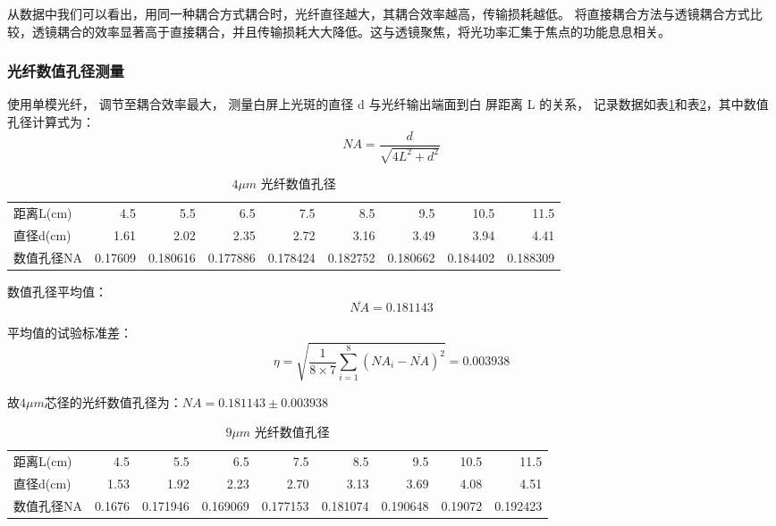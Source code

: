 \documentclass[10pt,a4paper,twoside,UTF8]{ctexart}
\begin{document}
从数据中我们可以看出，用同一种耦合方式耦合时，光纤直径越大，其耦合效率越高，传输损耗越低。
将直接耦合方法与透镜耦合方式比较，透镜耦合的效率显著高于直接耦合，并且传输损耗大大降低。这与透镜聚焦，将光功率汇集于焦点的功能息息相关。

\subsubsection{光纤数值孔径测量}

使用单模光纤， 调节至耦合效率最大， 测量白屏上光斑的直径 d 与光纤输出端面到白
屏距离 L 的关系， 记录数据如表\ref{tab:NA4}和表\ref{tab:NA9}，其中数值孔径计算式为：
\begin{equation*}
	NA=\frac{d}{\sqrt{4L^2+d^2}}
\end{equation*}
\begin{table}[H]
	\caption{$4\mu m$ 光纤数值孔径}
	\centering
	  \begin{tabular}{lrrrrrrrr}
		\toprule
	  距离L(cm) & 4.5   & 5.5   & 6.5   & 7.5   & 8.5   & 9.5   & 10.5  & 11.5 \\
	  直径d(cm) & 1.61  & 2.02  & 2.35  & 2.72  & 3.16  & 3.49  & 3.94  & 4.41 \\
	  数值孔径NA & 0.17609 & 0.180616 & 0.177886 & 0.178424 & 0.182752 & 0.180662 & 0.184402 & 0.188309 \\
	    \bottomrule
	  \end{tabular}%
	\label{tab:NA4}%
  \end{table}%

  数值孔径平均值：
  \begin{equation*}
	  \overline{NA}=0.181143 
  \end{equation*}

  平均值的试验标准差：
  \begin{equation*}
	  \eta = \sqrt{\frac{1}{8\times7} \sum_{i = 1}^{8} \left(NA_i-\overline{NA}\right)^2 }=0.003938
  \end{equation*}

  故$4\mu m$芯径的光纤数值孔径为：$NA=0.181143\pm0.003938$
  
\begin{table}[H]
	\caption{$9\mu m$ 光纤数值孔径}
	\centering
	  \begin{tabular}{lrrrrrrrr}
		\toprule
	  距离L(cm) & 4.5   & 5.5   & 6.5   & 7.5   & 8.5   & 9.5   & 10.5  & 11.5 \\
	  直径d(cm) & 1.53  & 1.92  & 2.23  & 2.70  & 3.13  & 3.69  & 4.08  & 4.51 \\
	  数值孔径NA & 0.1676 & 0.171946 & 0.169069 & 0.177153 & 0.181074 & 0.190648 & 0.19072 & 0.192423 \\
    	\bottomrule
	  \end{tabular}%
	\label{tab:NA9}%
  \end{table}%
\end{document}

